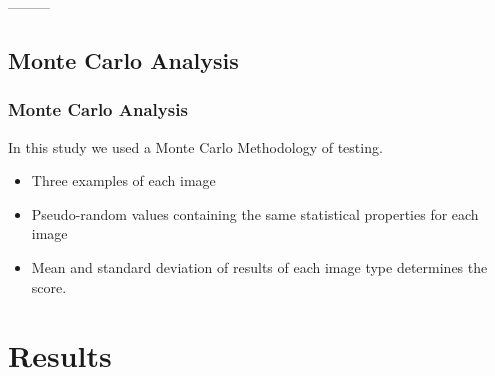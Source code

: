 \documentclass[9pt]{beamer}
\begin{document}
---------
\subsection{Monte Carlo Analysis}
		\begin{frame}
				\frametitle{Monte Carlo Analysis}
			 			In this study we used a Monte Carlo Methodology of testing.
			 			\begin{itemize}
			 			\item Three examples of each image
			 			\item Pseudo-random values containing the same statistical properties for each image 
			 			\item Mean and standard deviation of results of each image type determines the score.
			 			\end{itemize}
	\end{frame}
\section{Results}
\end{document}

